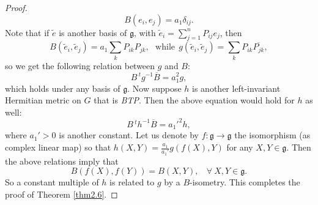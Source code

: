 \documentclass[10pt,a4paper]{amsart}
\begin{document}
\begin{proof}
$$ B(e_i,e_j) =  a_1 \delta_{ij}. $$
Note that if  $\tilde{e}$ is another basis of ${\mathfrak g}$, with $\tilde{e}_i=\sum_{j=1}^nP_{ij}e_j$, then
$$ B(\tilde{e}_i,\tilde{e}_j) =  a_1 \sum_k P_{ik}P_{jk} , \ \ \ \mbox{while} \ \ g(\tilde{e}_i,\tilde{e}_j) = \sum_k P_{ik}\overline{P_{jk}} , $$
so we get the following relation between $g$ and $B$:
$$
B \,^t\!g^{-1} \overline{B} = a_1^2 g,
$$
which holds under any basis of ${\mathfrak g}$. Now suppose $h$ is another left-invariant Hermitian metric on $G$ that is {\em {\rm BTP}}. Then the above equation would hold for $h$ as well:
$$ B \,^t\!h^{-1} \overline{B} = a_1'^2h,$$
where $a_1'>0$ is another constant. Let us denote by $f: {\mathfrak g} \rightarrow {\mathfrak g}$ the isomorphism (as complex linear map) so that $h(X,Y)=\frac{a_1}{a_1'} g(f(X), Y)$ for any $X,Y \in {\mathfrak g}$. Then the above relations imply that
\begin{equation} \label{Bf}
 B(f(X), f(Y)) = B(X,Y) , \ \ \ \ \forall \ X, Y\in {\mathfrak g}.
\end{equation}
So a constant multiple of $h$ is related to $g$ by a $B$-isometry. This completes the proof of Theorem \ref{thm2.6}.
\end{proof}
\end{document}
